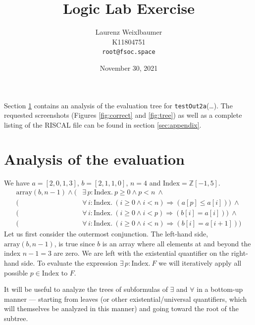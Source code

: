 \documentclass{article}
\title{\textbf{Logic Lab Exercise}}
\author{Laurenz Weixlbaumer\\K11804751\\\texttt{root@fsoc.space}}
\date{November 30, 2021}
\begin{document}
\begin{titlepage}
\maketitle
\thispagestyle{empty}
\end{titlepage}

Section \ref{sec:analysis} contains an analysis of the evaluation tree for \texttt{testOut2a}(\ldots). The requested screenshots (Figures \ref{fig:correct} and \ref{fig:tree}) as well as a complete listing of the RISCAL file can be found in section \ref{sec:appendix}.

\section{Analysis of the evaluation}
\label{sec:analysis}

We have $a = [2, 0, 1, 3]$, $b = [ 2, 1, 1, 0 ]$, $n = 4$ and $\text{Index} = \mathbb{Z}[-1,5]$.
%
\footnotesize
\begin{equation*}
\begin{split}     
    \text{array}(b, n - 1) \land
    (&\exists\, p: \text{Index.}\ p \geq 0 \land p < n\ \land \\
    (&\forall\, i:\text{Index.}\ (i \geq 0 \land i < n) \Rightarrow (a[p] \leq a[i]))\ \land\\
    (&\forall\, i:\text{Index.}\ (i \geq 0 \land i < p) \Rightarrow (b[i] = a[i]))\ \land\\
    (&\forall\, i:\text{Index.}\ (i \geq 0 \land i < n) \Rightarrow (b[i] = a[i + 1]))
\end{split}
\end{equation*}
\normalsize
%
Let us first consider the outermost conjunction. The left-hand side, $\text{array}(b, n - 1)$, is true since $b$ is an array where all elements at and beyond the index $n - 1 = 3$ are zero. We are left with the existential quantifier on the right-hand side. To evaluate the expression $\exists\, p: \text{Index.}\ F$ we will iteratively apply all possible $p \in \text{Index}$ to $F$.

It will be useful to analyze the trees of subformulas of $\exists$ and $\forall$ in a bottom-up manner --- starting from leaves (or other existential/universal quantifiers, which will themselves be analyzed in this manner) and going toward the root of the subtree.
\end{document}
